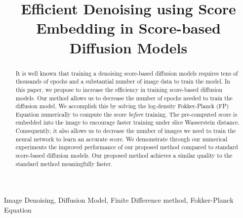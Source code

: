 \documentclass[]{interact}
\theoremstyle{plain}%
\theoremstyle{definition}
\theoremstyle{remark}
\begin{document}
\articletype{}

\title{Efficient Denoising using Score Embedding in Score-based Diffusion Models}

\author{
}

\maketitle
\begin{abstract}
It is well known that training a denoising score-based diffusion models requires tens of thousands of epochs and a substantial number of image data to train the model. In this paper, we propose to increase the efficiency in training score-based diffusion models. Our method allows us to decrease the number of epochs needed to train the diffusion model. We accomplish this by solving the log-density Fokker-Planck (FP) Equation numerically to compute the score \textit{before} training. The pre-computed score is embedded into the image to encourage faster training under slice Wasserstein distance. Consequently, it also allows us to decrease the number of images we need to train the neural network to learn an accurate score. We demonstrate through our numerical experiments the improved performance of our proposed method compared to standard score-based diffusion models. Our proposed method achieves a similar quality to the standard method meaningfully faster.  
\end{abstract}

\begin{keywords}
Image Denoising, Diffusion Model, Finite Difference method, Fokker-Planck Equation
\end{keywords}
\end{document}
